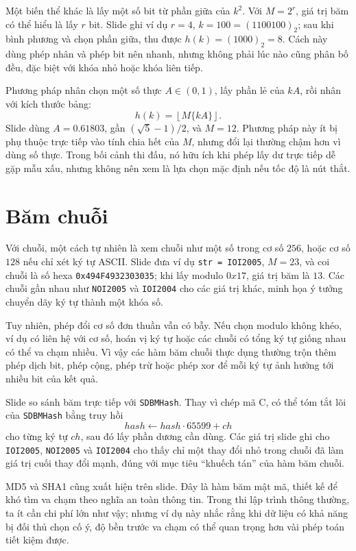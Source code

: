 \documentclass[11pt]{article}
\newcommand{\floor}[1]{\left\lfloor #1 \right\rfloor}
\newcommand{\fracpart}[1]{\{#1\}}
\begin{document}
Một biến thể khác là lấy một số bit từ phần giữa của \(k^2\). Với \(M=2^r\),
giá trị băm có thể hiểu là lấy \(r\) bit. Slide ghi ví dụ \(r=4\),
\(k=100=(1100100)_2\); sau khi bình phương và chọn phần giữa, thu được
\(h(k)=(1000)_2=8\). Cách này dùng phép nhân và phép bit nên nhanh, nhưng
không phải lúc nào cũng phân bố đều, đặc biệt với khóa nhỏ hoặc khóa liên
tiếp.

Phương pháp nhân chọn một số thực \(A\in(0,1)\), lấy phần lẻ của \(kA\), rồi
nhân với kích thước bảng:
\[
  h(k)=\floor{M\fracpart{kA}}.
\]
Slide dùng \(A=0.61803\), gần \((\sqrt5-1)/2\), và \(M=12\). Phương pháp này
ít bị phụ thuộc trực tiếp vào tính chia hết của \(M\), nhưng đổi lại thường
chậm hơn vì dùng số thực. Trong bối cảnh thi đấu, nó hữu ích khi phép lấy dư
trực tiếp dễ gặp mẫu xấu, nhưng không nên xem là lựa chọn mặc định nếu tốc độ
là nút thắt.

\section{Băm chuỗi}

Với chuỗi, một cách tự nhiên là xem chuỗi như một số trong cơ số \(256\), hoặc
cơ số \(128\) nếu chỉ xét ký tự ASCII. Slide đưa ví dụ
\texttt{str = IOI2005}, \(M=23\), và coi chuỗi là số hexa
\texttt{0x494F4932303035}; khi lấy modulo \(0x17\), giá trị băm là \(13\).
Các chuỗi gần nhau như \texttt{NOI2005} và \texttt{IOI2004} cho các giá trị
khác, minh họa ý tưởng chuyển dãy ký tự thành một khóa số.

Tuy nhiên, phép đổi cơ số đơn thuần vẫn có bẫy. Nếu chọn modulo không khéo,
ví dụ có liên hệ với cơ số, hoán vị ký tự hoặc các chuỗi có tổng ký tự giống
nhau có thể va chạm nhiều. Vì vậy các hàm băm chuỗi thực dụng thường trộn
thêm phép dịch bit, phép cộng, phép trừ hoặc phép xor để mỗi ký tự ảnh hưởng
tới nhiều bit của kết quả.

Slide so sánh băm trực tiếp với \texttt{SDBMHash}. Thay vì chép mã C, có thể
tóm tắt lõi của \texttt{SDBMHash} bằng truy hồi
\[
  hash \leftarrow hash\cdot 65599 + ch
\]
cho từng ký tự \(ch\), sau đó lấy phần dương cần dùng. Các giá trị slide ghi
cho \texttt{IOI2005}, \texttt{NOI2005} và \texttt{IOI2004} cho thấy chỉ một
thay đổi nhỏ trong chuỗi đã làm giá trị cuối thay đổi mạnh, đúng với mục tiêu
``khuếch tán'' của hàm băm chuỗi.

MD5 và SHA1 cũng xuất hiện trên slide. Đây là hàm băm mật mã, thiết kế để
khó tìm va chạm theo nghĩa an toàn thông tin. Trong thi lập trình thông
thường, ta ít cần chi phí lớn như vậy; nhưng ví dụ này nhắc rằng khi dữ liệu
có khả năng bị đối thủ chọn cố ý, độ bền trước va chạm có thể quan trọng hơn
vài phép toán tiết kiệm được.
\end{document}
